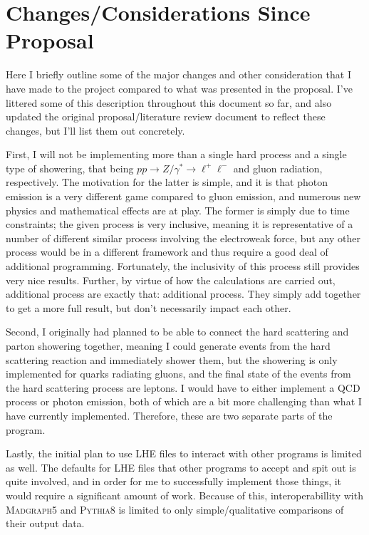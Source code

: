 \section{Changes/Considerations Since Proposal}

Here I briefly outline some of the major changes and other consideration that I have made to the project compared to what was presented in the proposal. I've littered some of this description throughout this document so far, and also updated the original proposal/literature review document to reflect these changes, but I'll list them out concretely.

First, I will not be implementing more than a single hard process and a single type of showering, that being $pp \rightarrow Z/\gamma^* \rightarrow \ell^+\ell^-$ and gluon radiation, respectively. The motivation for the latter is simple, and it is that photon emission is a very different game compared to gluon emission, and numerous new physics and mathematical effects are at play. The former is simply due to time constraints; the given process is very inclusive, meaning it is representative of a number of different similar process involving the electroweak force, but any other process would be in a different framework and thus require a good deal of additional programming. Fortunately, the inclusivity of this process still provides very nice results. Further, by virtue of how the calculations are carried out, additional process are exactly that: additional process. They simply add together to get a more full result, but don't necessarily impact each other.

Second, I originally had planned to be able to connect the hard scattering and parton showering together, meaning I could generate events from the hard scattering reaction and immediately shower them, but the showering is only implemented for quarks radiating gluons, and the final state of the events from the hard scattering process are leptons. I would have to either implement a QCD process or photon emission, both of which are a bit more challenging than what I have currently implemented. Therefore, these are two separate parts of the program.

Lastly, the initial plan to use LHE files to interact with other programs is limited as well. The defaults for LHE files that other programs to accept and spit out is quite involved, and in order for me to successfully implement those things, it would require a significant amount of work. Because of this, interoperabillity with \textsc{Madgraph5} and \textsc{Pythia8} is limited to only simple/qualitative comparisons of their output data.

